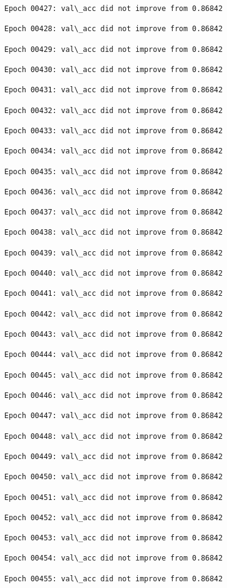 \documentclass[11pt]{article}
\begin{document}
\begin{Verbatim}[commandchars=\\\{\}]
Epoch 00427: val\_acc did not improve from 0.86842

Epoch 00428: val\_acc did not improve from 0.86842

Epoch 00429: val\_acc did not improve from 0.86842

Epoch 00430: val\_acc did not improve from 0.86842

Epoch 00431: val\_acc did not improve from 0.86842

Epoch 00432: val\_acc did not improve from 0.86842

Epoch 00433: val\_acc did not improve from 0.86842

Epoch 00434: val\_acc did not improve from 0.86842

Epoch 00435: val\_acc did not improve from 0.86842

Epoch 00436: val\_acc did not improve from 0.86842

Epoch 00437: val\_acc did not improve from 0.86842

Epoch 00438: val\_acc did not improve from 0.86842

Epoch 00439: val\_acc did not improve from 0.86842

Epoch 00440: val\_acc did not improve from 0.86842

Epoch 00441: val\_acc did not improve from 0.86842

Epoch 00442: val\_acc did not improve from 0.86842

Epoch 00443: val\_acc did not improve from 0.86842

Epoch 00444: val\_acc did not improve from 0.86842

Epoch 00445: val\_acc did not improve from 0.86842

Epoch 00446: val\_acc did not improve from 0.86842

Epoch 00447: val\_acc did not improve from 0.86842

Epoch 00448: val\_acc did not improve from 0.86842

Epoch 00449: val\_acc did not improve from 0.86842

Epoch 00450: val\_acc did not improve from 0.86842

Epoch 00451: val\_acc did not improve from 0.86842

Epoch 00452: val\_acc did not improve from 0.86842

Epoch 00453: val\_acc did not improve from 0.86842

Epoch 00454: val\_acc did not improve from 0.86842

Epoch 00455: val\_acc did not improve from 0.86842


\end{Verbatim}
\end{document}
